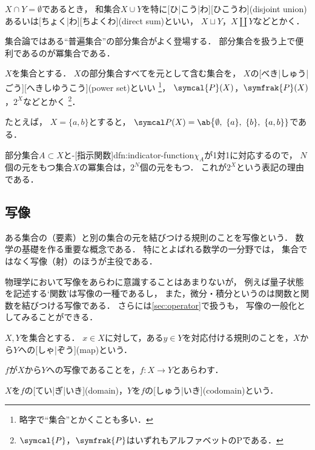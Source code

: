 \documentclass[../sotsu.tex]{subfiles}
\begin{document}
\begin{definition}[非交和]
    \label{dfn:disjoint-union}
    $X \cap Y = \emptyset$であるとき，
    和集合$X \cup Y$を特に[ひ|こう|わ][ひこうわ](disjoint union)
    あるいは[ちょく|わ][ちよくわ](direct sum)といい，
    $X \sqcup Y$，$X \amalg Y$などとかく．
\end{definition}




集合論ではある``普遍集合''の部分集合がよく登場する．
部分集合を扱う上で便利であるのが冪集合である．

\begin{definition}
    \label{dfn:power-set}
    $X$を集合とする．
    $X$の部分集合すべてを元として含む集合を，
    $X$の[べき|しゅう|ごう][へきしゆうこう](power set)といい%
    \footnote{略字で``集合''とかくことも多い．}，
    $\symcal{P}(X)$，$\symfrak{P}(X)$，$2^X$などとかく%
    \footnote{
        $\symcal{P}$，$\symfrak{P}$はいずれもアルファベットのPである．
    }．
\end{definition}

たとえば，
$X = \{ a, b \}$とすると，
$\pset(X) = \ab \big \{ \emptyset, \  \{ a \}, \  \{ b \}, \  \{ a, b \}  \}$である．

部分集合$A \subset X$と-[指示関数]{dfn:indicator-function}$\chi_A$が1対1に対応するので，
$N$個の元をもつ集合$X$の冪集合は，$2^N$個の元をもつ．
これが$2^X$という表記の理由である．





\subsection{写像}
\label{sec:map}

ある集合の（要素）と別の集合の元を結びつける規則のことを写像という．
数学の基礎を作る重要な概念である．
特にとよばれる数学の一分野では，
集合ではなく写像（射）のほうが主役である．

物理学において写像をあらわに意識することはあまりないが，
例えば量子状態を記述する`関数'は写像の一種であるし，
また，微分・積分というのは関数と関数を結びつける写像である．
さらには\cref{sec:operator}で扱うも，
写像の一般化としてみることができる．

\begin{definition}[写像]
    \label{dfn:map}
    $X, Y$を集合とする．
    $x \in X$に対して，ある$y \in Y$を対応付ける規則のことを，$X$から$Y$への[しゃ|ぞう](map)という．
    
    $f$が$X$から$Y$への写像であることを，$f \colon X \to Y$とあらわす．

    $X$を$f$の[てい|ぎ|いき](domain)，$Y$を$f$の[しゅう|いき](codomain)という．
\end{definition}
\end{document}
